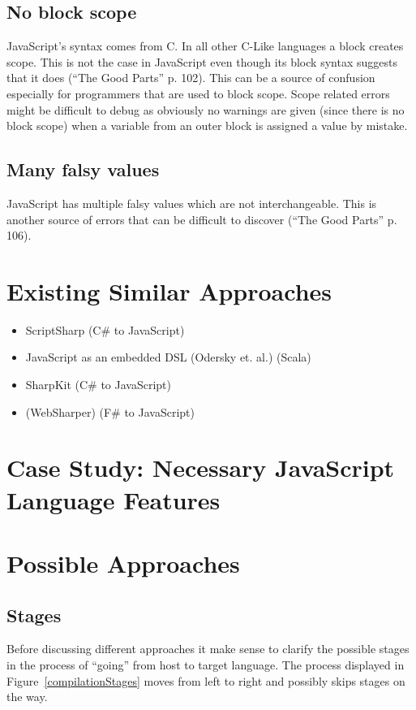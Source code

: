	\subsection{No block scope}
		JavaScript’s syntax comes from C. In all other C-Like languages a block creates scope. This is not the case in JavaScript even though its block syntax suggests that it does (“The Good Parts” p. 102). This can be a source of confusion especially for programmers that are used to block scope. Scope related errors might be difficult to debug as obviously no warnings are given (since there is no block scope) when a variable from an outer block is assigned a value by mistake.

	\subsection{Many falsy values}
		JavaScript has multiple falsy values which are not interchangeable. This is another source of errors that can be difficult to discover (“The Good Parts” p. 106).

\section{Existing Similar Approaches}
	\begin{itemize}
		\item ScriptSharp (C\# to JavaScript)
		\item JavaScript as an embedded DSL (Odersky et. al.) (Scala)
		\item SharpKit (C\# to JavaScript)
		\item (WebSharper) (F\# to JavaScript)
	\end{itemize}



\section{Case Study: Necessary JavaScript Language Features}

\section{Possible Approaches}
	\subsection{Stages}
		Before discussing different approaches it make sense to clarify the possible stages in the process of “going” from host to target language. The process displayed in Figure~\ref{compilationStages} moves from left to right and possibly skips stages on the way.
		
